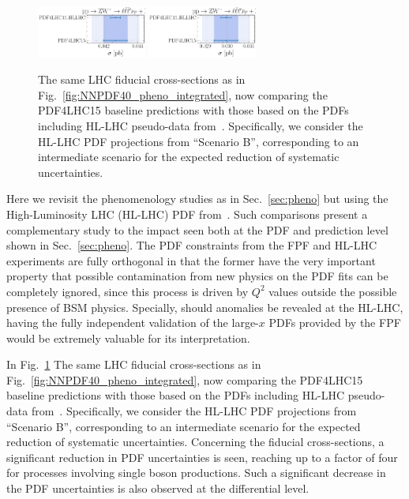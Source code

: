\begin{figure}[!h]
	\includegraphics[width=0.32\textwidth]{plots/LHCpheno/NNPDF_WPZ_14TEV_40_PHENO-integrated-HLLHC.pdf}
	\includegraphics[width=0.32\textwidth]{plots/LHCpheno/NNPDF_WMZ_14TEV_40_PHENO-integrated-HLLHC.pdf}
	\caption{The same LHC fiducial cross-sections as in Fig.~\ref{fig:NNPDF40_pheno_integrated},
          now comparing the PDF4LHC15 baseline predictions with those based
          on the PDFs including HL-LHC pseudo-data from~\cite{AbdulKhalek:2018rok}.
          Specifically, we consider the HL-LHC PDF projections
          from ``Scenario B'', corresponding to an intermediate scenario for the expected reduction
          of systematic uncertainties. }
	\label{fig:HLLHC_pheno_integrated}
\end{figure}

Here we revisit the phenomenology studies as in
Sec.~\ref{sec:pheno} but using the High-Luminosity LHC (HL-LHC) PDF 
from~\cite{AbdulKhalek:2018rok}.
%
Such comparisons present a complementary study to the impact seen both at the PDF 
and prediction level shown in Sec.~\ref{sec:pheno}. The PDF constraints from the 
FPF and HL-LHC experiments are fully orthogonal in that the former have the very 
important property that possible contamination from new physics on the PDF fits 
can be completely ignored, since this process is driven by $Q^2$ values outside 
the possible presence of BSM physics.
%
Specially, should anomalies be revealed at the HL-LHC, having the fully independent
validation of the large-$x$ PDFs provided by the FPF would be extremely valuable 
for its interpretation.

In Fig.~\ref{fig:HLLHC_pheno_integrated} The same LHC fiducial cross-sections as in Fig.~\ref{fig:NNPDF40_pheno_integrated},
now comparing the PDF4LHC15 baseline predictions with those based
on the PDFs including HL-LHC pseudo-data from~\cite{AbdulKhalek:2018rok}.
%
Specifically, we consider the HL-LHC PDF projections
from ``Scenario B'', corresponding to an intermediate scenario for the expected reduction
of systematic uncertainties.
Concerning the fiducial cross-sections, a significant reduction in PDF uncertainties
is seen, reaching up to a factor of four for processes involving single boson productions. 
Such a significant decrease in the PDF uncertainties is also observed at the differential
level.


